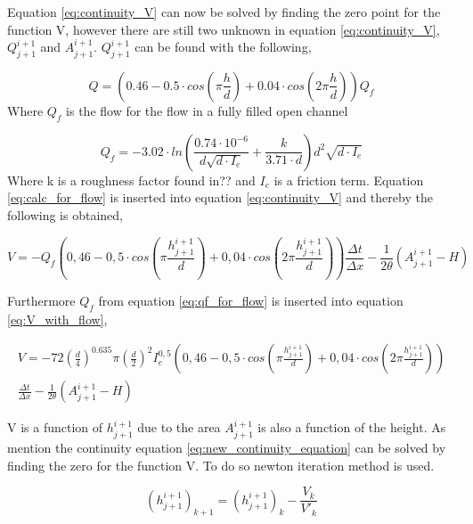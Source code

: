 Equation \ref{eq:continuity_V} can now be solved by finding the zero point for the function V, however there are still two unknown in equation \ref{eq:continuity_V}, $Q_{j+1}^{i+1}$ and $A_{j+1}^{i+1}$. $Q_{j+1}^{i+1}$ can be found with the following, 

\begin{equation}\label{eq:calc_for_flow}
 	Q = \left(0.46-0.5 \cdot cos\left(\pi \frac{h}{d}\right)+0.04\cdot cos\left(2\pi\frac{h}{d}\right)\right)Q_f
\end{equation}
Where $Q_f$ is the flow for the flow in a fully filled open channel 

\begin{equation}\label{eq:qf_for_flow}
	Q_f = -3.02 \cdot ln\left(\frac{0.74\cdot 10^{-6}}{d\sqrt{d\cdot I_e}}+\frac{k}{3.71\cdot d}\right)d^2\sqrt{d\cdot I_e}
\end{equation}
Where k is a roughness factor found in??  and $I_e$ is a friction term. Equation \ref{eq:calc_for_flow} is inserted into equation \ref{eq:continuity_V} and thereby the following is obtained,

\begin{equation}\label{eq:V_with_flow}
	V = -Q_f\left(0,46-0,5\cdot cos\left(\pi \frac{h_{j+1}^{i+1}}{d}\right)+0,04\cdot cos\left(2\pi\frac{h_{j+1}^{i+1}}{d}\right)\right)\frac{\Delta t}{\Delta x}-\frac{1}{2\theta}\left(A_{j+1}^{i+1}-H\right)
\end{equation}

Furthermore $Q_f$ from equation \ref{eq:qf_for_flow} is inserted into equation \ref{eq:V_with_flow}, 

\begin{multline}\label{eq:new_continuity_equation}
	V = -72\left(\frac{d}{4}\right)^{0.635}\pi\left(\frac{d}{2}\right)^2I_e^{0,5} \left(0,46-0,5\cdot cos\left(\pi \frac{h_{j+1}^{i+1}}{d}\right)+ 0,04\cdot cos\left(2\pi\frac{h_{j+1}^{i+1}}{d}\right)\right)\\ \frac{\Delta t}{\Delta x}-\frac{1}{2\theta}\left(A_{j+1}^{i+1}-H\right)
\end{multline}

V is a function of $h_{j+1}^{i+1}$ due to the area $A_{j+1}^{i+1}$ is also a function of the height. As mention the continuity equation \ref{eq:new_continuity_equation} can be solved by finding the zero for the function V. To do so newton iteration method is used.

\begin{equation}
	 (h_{j+1}^{i+1})_{k+1} =(h_{j+1}^{i+1})_{k} - \frac{V_k}{V'_k} 
\end{equation}  

